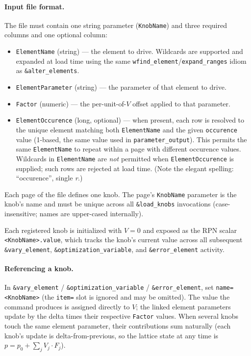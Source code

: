 \documentclass[11pt]{article}
\begin{document}
\paragraph{Input file format.}
The file must contain one string parameter (\verb|KnobName|) and
three required columns and one optional column:
\begin{itemize}
\item \verb|ElementName| (string) --- the element to drive.  Wildcards
        are supported and expanded at load time using the same
        \verb|wfind_element|/\verb|expand_ranges| idiom as
        \verb|&alter_elements|.
\item \verb|ElementParameter| (string) --- the parameter of that
        element to drive.
\item \verb|Factor| (numeric) --- the per-unit-of-$V$ offset applied
        to that parameter.
\item \verb|ElementOccurence| (long, optional) --- when present, each
        row is resolved to the unique element matching both
        \verb|ElementName| and the given \verb|occurence| value
        (1-based, the same value used in
        \verb|parameter_output|).  This permits the same
        \verb|ElementName| to repeat within a page with different
        occurence values.  Wildcards in \verb|ElementName| are
        \emph{not} permitted when \verb|ElementOccurence| is supplied;
        such rows are rejected at load time.  (Note the elegant
        spelling: ``occurence'', single \emph{r}.)
\end{itemize}
Each page of the file defines one knob.  The page's \verb|KnobName|
parameter is the knob's name and must be unique across all
\verb|&load_knobs| invocations (case-insensitive; names are
upper-cased internally).

Each registered knob is initialized with $V{=}0$ and exposed as the
RPN scalar \verb|<KnobName>.value|, which tracks the knob's current
value across all subsequent \verb|&vary_element|,
\verb|&optimization_variable|, and \verb|&error_element| activity.

\paragraph{Referencing a knob.}
In \verb|&vary_element| / \verb|&optimization_variable| /
\verb|&error_element|, set \verb|name=<KnobName>| (the \verb|item=|
slot is ignored and may be omitted).  The value the command produces
is assigned directly to $V$; the linked element parameters update by
the delta times their respective \verb|Factor| values.  When several
knobs touch the same element parameter, their contributions sum
naturally (each knob's update is delta-from-previous, so the lattice
state at any time is $p = p_0 + \sum_j V_j \cdot F_j$).
\end{document}

